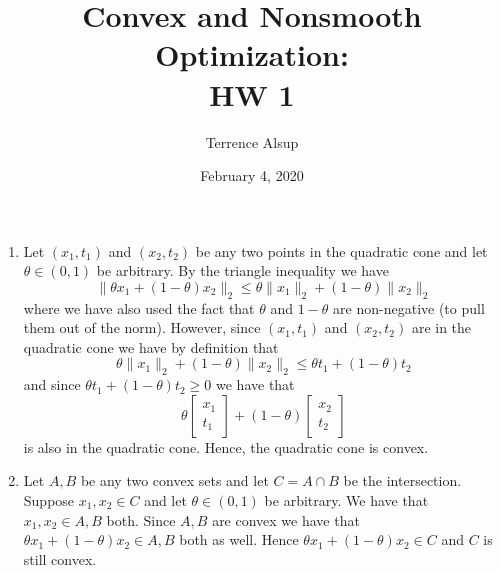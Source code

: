 \documentclass[11pt]{amsart}
\title{Convex and Nonsmooth Optimization:\\HW 1}
\author{Terrence Alsup}
\date{February 4, 2020}
\begin{document}
\maketitle
\begin{enumerate}
\item Let $(x_1,t_1)$ and $(x_2,t_2)$ be any two points in the quadratic cone and let $\theta \in (0,1)$ be arbitrary.  By the triangle inequality we have
\[
\|\theta x_1 + (1-\theta)x_2\|_2 \le \theta \|x_1\|_2 + (1 - \theta) \|x_2\|_2
\]
where we have also used the fact that $\theta$ and $1 - \theta$ are non-negative (to pull them out of the norm).  However, since $(x_1,t_1)$ and $(x_2,t_2)$ are in the quadratic cone we have by definition that
\[
\theta \|x_1\|_2 + (1 - \theta) \|x_2\|_2 \le \theta t_1 + (1 - \theta)t_2
\]
and since $\theta t_1 + (1 - \theta)t_2 \ge 0$ we have that
\[
\theta\begin{bmatrix}x_1\\t_1\end{bmatrix} + (1-\theta)\begin{bmatrix}x_2\\t_2\end{bmatrix}
\]
is also in the quadratic cone.  Hence, the quadratic cone is convex.

\vspace{0.5in}

\item  Let $A,B$ be any two convex sets and let $C = A \cap B$ be the intersection.  Suppose $x_1,x_2 \in C$ and let $\theta \in (0,1)$ be arbitrary.  We have that $x_1,x_2 \in A,B$ both.  Since $A,B$ are convex we have that $\theta x_1 + (1-\theta)x_2 \in A,B$ both as well.  Hence $\theta x_1 + (1-\theta)x_2 \in C$ and $C$ is still convex.

\vspace{0.5in}


\end{enumerate}
\end{document}

